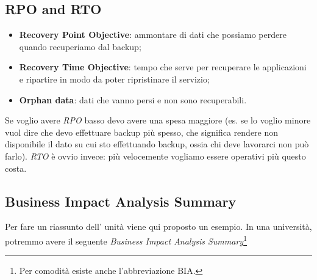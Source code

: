 \subsection{RPO and RTO}

\begin{itemize}
 \item \textbf{Recovery Point Objective}: ammontare di dati che possiamo
perdere quando recuperiamo dal backup;

 \item \textbf{Recovery Time Objective}: tempo che serve per recuperare le
applicazioni e ripartire in modo da poter ripristinare il servizio;

 \item \textbf{Orphan data}: dati che vanno persi e non sono recuperabili.
\end{itemize}

Se voglio avere \textit{RPO} basso devo avere una spesa maggiore (es. se lo
voglio minore vuol dire che devo effettuare backup più spesso, che significa
rendere non disponibile il dato su cui sto effettuando backup, ossia chi deve
lavorarci non può farlo).
\textit{RTO} è ovvio invece: più velocemente vogliamo essere operativi più
questo costa.

\subsection{Business Impact Analysis Summary}

Per fare un riassunto dell' unità viene qui proposto un esempio. In una
università, potremmo avere il seguente \textit{Business Impact Analysis
Summary}\footnote{Per comodità esiste anche l'abbreviazione BIA.}

\begin{table}[H]
\centering
{}
\caption{Un esempio di BIA per una Università}
\end{table}


